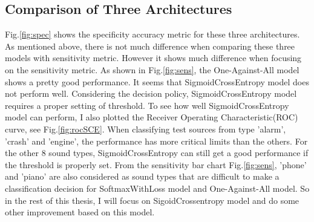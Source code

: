 \subsection{Comparison of Three Architectures}
Fig.\ref{fig:spec} shows the specificity accuracy metric for these three architectures. As mentioned above, there is not much difference when comparing these three models with sensitivity metric. However it shows much difference when focusing on the sensitivity metric. As shown in Fig.\ref{fig:sens}, the One-Against-All model shows a pretty good performance. It seems that SigmoidCrossEntropy model does not perform well. Considering the decision policy, SigmoidCrossEntropy model requires a proper setting of threshold. To see how well SigmoidCrossEntropy model can perform, I also plotted the Receiver Operating Characteristic(ROC) curve, see Fig.\ref{fig:rocSCE}. When classifying test sources from type 'alarm', 'crash' and 'engine', the performance has more critical limits than the others. For the other 8 sound types, SigmoidCrossEntropy can still get a good performance if the threshold is properly set. From the sensitivity bar chart Fig.\ref{fig:sens}, 'phone' and 'piano' are also considered as sound types that are difficult to make a classification decision for SoftmaxWithLoss model and One-Against-All model. So in the rest of this thesis, I will focus on SigoidCrossentropy model and do some other improvement based on this model.
